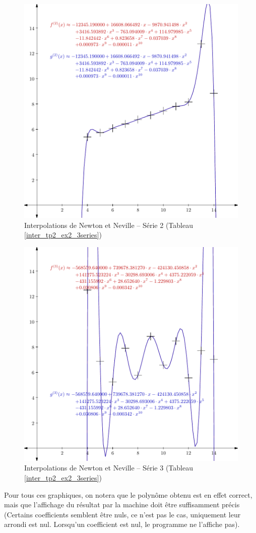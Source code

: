 \documentclass{report}
\begin{document}
	\begin{figure}[h]
	  \centering
	  \includegraphics[scale=0.5]{graphiques/pdf_output/inter_tp2_ex2_2.pdf}
	  \caption{Interpolations de Newton et Neville -- Série 2 (Tableau \ref{inter_tp2_ex2_3series})}
	\end{figure}
	\newpage
	\begin{figure}[h]
	  \centering
 	  \includegraphics[scale=0.5]{graphiques/pdf_output/inter_tp2_ex2_3.pdf}
	  \caption{Interpolations de Newton et Neville -- Série 3 (Tableau \ref{inter_tp2_ex2_3series})}
	\end{figure}
	Pour tous ces graphiques, on notera que le polynôme obtenu est en effet correct, mais que l'affichage du résultat par la machine doit être suffisamment précis (Certains coefficients semblent être nuls, ce n'est pas le cas, uniquement leur arrondi est nul. Lorsqu'un coefficient est nul, le programme ne l'affiche pas).
      \newpage
\end{document}
